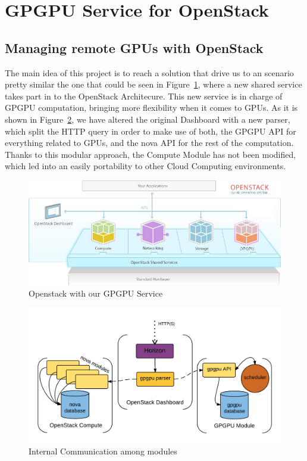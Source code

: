 \documentclass[a4paper,twoside]{article}
\begin{document}
\section{GPGPU Service for OpenStack}
\subsection{Managing remote GPUs with OpenStack}
The main idea of this project is to reach a solution that drive us to an scenario pretty similar the one that could be seen in Figure~\ref{fig:external}, where a new shared service takes part in to the OpenStack Architecure.
This new service is in charge of GPGPU computation, bringing more flexibility when it comes to GPUs.
As it is shown in Figure~\ref{fig:internal}, we have altered the original Dashboard with a new parser, 
which split the HTTP query in order to make use of both, the GPGPU API for everything related to GPUs, and the nova API for the rest of the computation. 
Thanks to this modular approach, the Compute Module has not been modified, which led into an easily portability to other Cloud Computing environments.

\begin{figure}[!t]
  \centering
  \includegraphics[width=\linewidth]{images/os1.jpg}
  \caption{Openstack with our GPGPU Service}
  \label{fig:external}
\end{figure}

\begin{figure}[!t]
  \centering
  \includegraphics[width=.9\linewidth]{images/os2.png}
  \caption{Internal Communication among modules}
  \label{fig:internal}
\end{figure}
\end{document}
